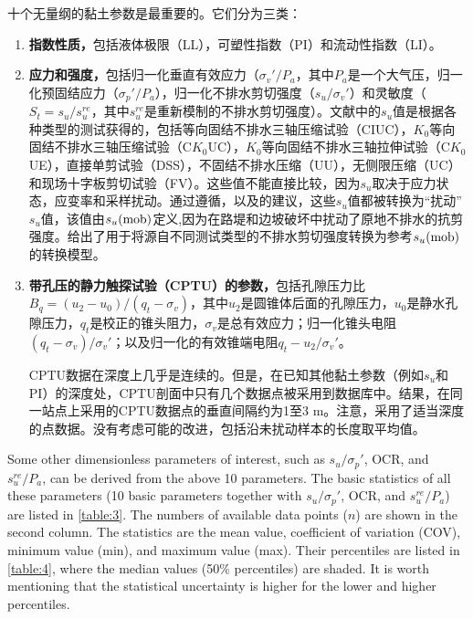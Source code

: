 \begin{paracol}{2}
    
    \switchcolumn
    
    十个无量纲的黏土参数是最重要的。它们分为三类：
    \begin{enumerate}
        \item \textbf{指数性质，}包括液体极限（LL），可塑性指数（PI）和流动性指数（LI）。
        
        \item \textbf{应力和强度，}包括归一化垂直有效应力（$\sigma_v'/P_a$，其中$P_a$是一个大气压，归一化预固结应力（$\sigma_p'/P_a$），归一化不排水剪切强度（$s_u/\sigma_v'$）和灵敏度（$S_t=s_u/s_u^{re}$，其中$s_u^{re}$是重新模制的不排水剪切强度）。文献中的$s_u$值是根据各种类型的测试获得的，包括等向固结不排水三轴压缩试验（CIUC），$K_0$等向固结不排水三轴压缩试验（C$K_0$UC），$K_0$等向固结不排水三轴拉伸试验（C$K_0$UE），直接单剪试验（DSS），不固结不排水压缩（UU），无侧限压缩（UC）和现场十字板剪切试验（FV）。这些值不能直接比较，因为$s_u$取决于应力状态，应变率和采样扰动。通过遵循\citet{Bjerrum19721}，\citet{Kulhawy1990}以及\citet{Mesri20071}的建议，这些$s_u$值都被转换为“扰动” $s_u$值，该值由$s_u(\rm{mob})$定义,因为在路堤和边坡破坏中扰动了原地不排水的抗剪强度\citep{Mesri20071}。给出了用于将源自不同测试类型的不排水剪切强度转换为参考$s_u(\rm{mob})$的转换模型。
        
        \item \textbf{带孔压的静力触探试验（CPTU）的参数，}包括孔隙压力比$B_q=(u_2-u_0)/(q_t-\sigma_v)$，其中$u_2$是圆锥体后面的孔隙压力，$u_0$是静水孔隙压力，$q_t$是校正的锥头阻力，$\sigma_v$是总有效应力；归一化锥头电阻$(q_t-\sigma_v)/\sigma_v'$；以及归一化的有效锥端电阻$q_t-u_2/\sigma_v'$。\par
        CPTU数据在深度上几乎是连续的。但是，在已知其他黏土参数（例如$s_u$和PI）的深度处，CPTU剖面中只有几个数据点被采用到数据库中。结果，在同一站点上采用的CPTU数据点的垂直间隔约为1至3 m。注意，采用了适当深度的点数据。没有考虑可能的改进，包括沿未扰动样本的长度取平均值。
    \end{enumerate}

    \switchcolumn*
    
    Some other dimensionless parameters of interest, such as $s_u/\sigma_p'$, OCR, and $s_u^{re}/P_a$, can be derived from the above 10 parameters. The basic statistics of all these parameters (10 basic parameters together with $s_u/\sigma_p'$, OCR, and $s_u^{re}/P_a$) are listed in \autoref{table:3}. The numbers of available data points ($n$) are shown in the second column. The statistics are the mean value, coefficient of variation (COV), minimum value (min), and maximum value (max). Their percentiles are listed in \autoref{table:4}, where the median values (50$\%$ percentiles) are shaded. It is worth mentioning that the statistical uncertainty is higher for the lower and higher percentiles.
    

\end{paracol}
